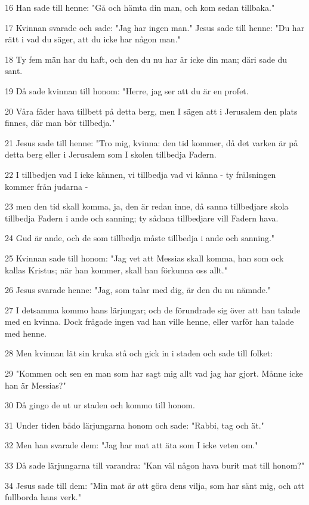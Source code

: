 \par 16 Han sade till henne: "Gå och hämta din man, och kom sedan tillbaka."
\par 17 Kvinnan svarade och sade: "Jag har ingen man." Jesus sade till henne: "Du har rätt i vad du säger, att du icke har någon man."
\par 18 Ty fem män har du haft, och den du nu har är icke din man; däri sade du sant.
\par 19 Då sade kvinnan till honom: "Herre, jag ser att du är en profet.
\par 20 Våra fäder hava tillbett på detta berg, men I sägen att i Jerusalem den plats finnes, där man bör tillbedja."
\par 21 Jesus sade till henne: "Tro mig, kvinna: den tid kommer, då det varken är på detta berg eller i Jerusalem som I skolen tillbedja Fadern.
\par 22 I tillbedjen vad I icke kännen, vi tillbedja vad vi känna - ty frälsningen kommer från judarna -
\par 23 men den tid skall komma, ja, den är redan inne, då sanna tillbedjare skola tillbedja Fadern i ande och sanning; ty sådana tillbedjare vill Fadern hava.
\par 24 Gud är ande, och de som tillbedja måste tillbedja i ande och sanning."
\par 25 Kvinnan sade till honom: "Jag vet att Messias skall komma, han som ock kallas Kristus; när han kommer, skall han förkunna oss allt."
\par 26 Jesus svarade henne: "Jag, som talar med dig, är den du nu nämnde."
\par 27 I detsamma kommo hans lärjungar; och de förundrade sig över att han talade med en kvinna. Dock frågade ingen vad han ville henne, eller varför han talade med henne.
\par 28 Men kvinnan lät sin kruka stå och gick in i staden och sade till folket:
\par 29 "Kommen och sen en man som har sagt mig allt vad jag har gjort. Månne icke han är Messias?"
\par 30 Då gingo de ut ur staden och kommo till honom.
\par 31 Under tiden bådo lärjungarna honom och sade: "Rabbi, tag och ät."
\par 32 Men han svarade dem: "Jag har mat att äta som I icke veten om."
\par 33 Då sade lärjungarna till varandra: "Kan väl någon hava burit mat till honom?"
\par 34 Jesus sade till dem: "Min mat är att göra dens vilja, som har sänt mig, och att fullborda hans verk."

